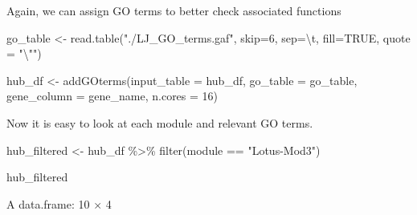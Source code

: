 \documentclass[
  letterpaper,
  DIV=11,
  numbers=noendperiod]{scrartcl}
\newenvironment{Shaded}{}{}
\newcommand{\AttributeTok}[1]{\textcolor[rgb]{0.49,0.56,0.16}{#1}}
\newcommand{\ConstantTok}[1]{\textcolor[rgb]{0.53,0.00,0.00}{#1}}
\newcommand{\DecValTok}[1]{\textcolor[rgb]{0.25,0.63,0.44}{#1}}
\newcommand{\FunctionTok}[1]{\textcolor[rgb]{0.02,0.16,0.49}{#1}}
\newcommand{\NormalTok}[1]{#1}
\newcommand{\OtherTok}[1]{\textcolor[rgb]{0.00,0.44,0.13}{#1}}
\newcommand{\SpecialCharTok}[1]{\textcolor[rgb]{0.25,0.44,0.63}{#1}}
\newcommand{\StringTok}[1]{\textcolor[rgb]{0.25,0.44,0.63}{#1}}
\begin{document}
Again, we can assign GO terms to better check associated functions

\begin{Shaded}
\begin{Highlighting}[]
\NormalTok{go\_table }\OtherTok{\textless{}{-}} \FunctionTok{read.table}\NormalTok{(}\StringTok{"./LJ\_GO\_terms.gaf"}\NormalTok{, }\AttributeTok{skip=}\DecValTok{6}\NormalTok{, }\AttributeTok{sep=}\StringTok{\textquotesingle{}}\SpecialCharTok{\textbackslash{}t}\StringTok{\textquotesingle{}}\NormalTok{, }\AttributeTok{fill=}\ConstantTok{TRUE}\NormalTok{, }\AttributeTok{quote =} \StringTok{"}\SpecialCharTok{\textbackslash{}"}\StringTok{"}\NormalTok{)}
\end{Highlighting}
\end{Shaded}

\begin{Shaded}
\begin{Highlighting}[]
\NormalTok{hub\_df }\OtherTok{\textless{}{-}} \FunctionTok{addGOterms}\NormalTok{(}\AttributeTok{input\_table =}\NormalTok{ hub\_df, }
                     \AttributeTok{go\_table =}\NormalTok{ go\_table, }
                     \AttributeTok{gene\_column =} \StringTok{\textquotesingle{}gene\_name\textquotesingle{}}\NormalTok{,}
                     \AttributeTok{n.cores =} \DecValTok{16}\NormalTok{)}
\end{Highlighting}
\end{Shaded}

Now it is easy to look at each module and relevant GO terms.

\begin{Shaded}
\begin{Highlighting}[]
\NormalTok{hub\_filtered }\OtherTok{\textless{}{-}}\NormalTok{ hub\_df }\SpecialCharTok{\%\textgreater{}\%} \FunctionTok{filter}\NormalTok{(module }\SpecialCharTok{==} \StringTok{"Lotus{-}Mod3"}\NormalTok{)}
\end{Highlighting}
\end{Shaded}

\begin{Shaded}
\begin{Highlighting}[]
\NormalTok{hub\_filtered}
\end{Highlighting}
\end{Shaded}

A data.frame: 10 × 4
\end{document}
